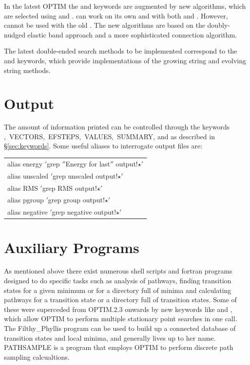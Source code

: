 {{{In the latest OPTIM the  and  keywords are augmented by new algorithms,
which are selected using  and .  can work on its
own and with both  and . However, 
cannot be used with the old .
The new algorithms are based on the doubly-nudged elastic band approach and a 
more sophisticated connection algorithm.\cite{TrygubenkoW04}

The latest double-ended search methods to be implemented correspond to the
 and  keywords, which provide implementations of the
growing string and evolving string methods.\cite{ERV02,PetersHBC04}

\section{Output}
\label{sec:output}
The amount of information printed can be controlled
through the keywords {,\ VECTORS,\ EFSTEPS,\ VALUES,\ SUMMARY,\/}
and {} as described in \S\ref{sec:keywords}.
Some useful aliases to interrogate output files are:

\medskip
\begin{tabular}{l}
alias energy $'$grep $''$Energy for last$''$ output!$\star$$'$ \\
alias unscaled $'$grep unscaled output!$\star$$'$ \\
alias RMS $'$grep RMS output!$\star$$'$ \\
alias pgroup $'$grep group output!$\star$$'$ \\
alias negative $'$grep negative output!$\star$$'$ \\
\end{tabular}

\section{Auxiliary Programs}
\label{sec:auxiliary}
As mentioned above there exist numerous shell scripts
and fortran programs designed to do specific tasks such as analysis of pathways,
finding transition states for a given minimum or for a directory full of minima and
calculating pathways for a transition state or a directory full of transition states.
Some of these were superceded from OPTIM.2.3 onwards by new keywords like 
and , which allow OPTIM to perform multiple stationary point searches 
in one call. The Filthy\_Phyllis program can be used to build up a connected database of
transition states and local minima, and generally lives up to her name.
PATHSAMPLE is a program that employs OPTIM to perform discrete path sampling
calcualtions.\cite{Wales02,Wales03}

}}}
